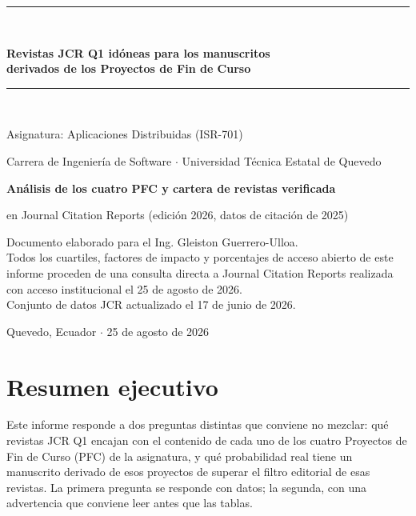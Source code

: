 \documentclass[11pt,a4paper]{article}
\begin{document}
\begin{titlepage}
	\centering
	\vspace*{1.6cm}
	{\color{azulUTEQ}\rule{\textwidth}{2pt}}\\[10pt]
	{\LARGE\bfseries\color{azulUTEQ} Revistas JCR Q1 idóneas para los manuscritos\\[6pt] derivados de los Proyectos de Fin de Curso\par}
	\vspace{10pt}
	{\color{azulUTEQ}\rule{\textwidth}{2pt}}\\[18pt]
	{\large Asignatura: Aplicaciones Distribuidas (ISR-701)\par}
	\vspace{4pt}
	{\large Carrera de Ingeniería de Software $\cdot$ Universidad Técnica Estatal de Quevedo\par}
	\vspace{30pt}
	{\large\bfseries Análisis de los cuatro PFC y cartera de revistas verificada\par}
	\vspace{6pt}
	{\large en Journal Citation Reports (edición 2026, datos de citación de 2025)\par}
	\vspace{40pt}
	\begin{minipage}{0.82\textwidth}
		\centering
		\color{grisTexto}
		\small
		Documento elaborado para el Ing. Gleiston Guerrero-Ulloa.\\[4pt]
		Todos los cuartiles, factores de impacto y porcentajes de acceso abierto de este informe proceden de una consulta directa a Journal Citation Reports realizada con acceso institucional el 25 de agosto de 2026.\\[4pt]
		Conjunto de datos JCR actualizado el 17 de junio de 2026.
	\end{minipage}
	\vfill
	{\small Quevedo, Ecuador $\cdot$ 25 de agosto de 2026\par}
\end{titlepage}

\tableofcontents
\newpage

\section{Resumen ejecutivo}

Este informe responde a dos preguntas distintas que conviene no mezclar: qué revistas JCR Q1 encajan con el contenido de cada uno de los cuatro Proyectos de Fin de Curso (PFC) de la asignatura, y qué probabilidad real tiene un manuscrito derivado de esos proyectos de superar el filtro editorial de esas revistas. La primera pregunta se responde con datos; la segunda, con una advertencia que conviene leer antes que las tablas.
\end{document}
